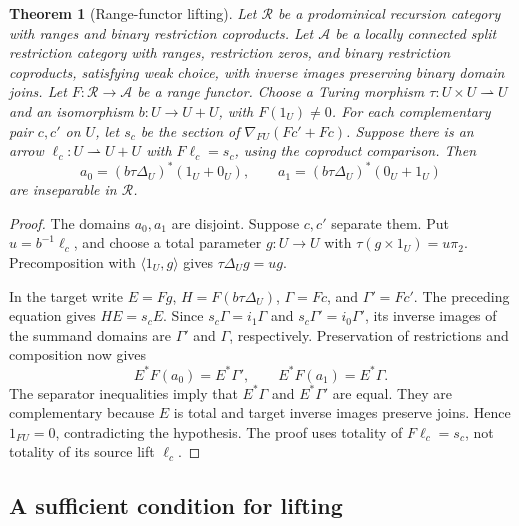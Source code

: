\documentclass[11pt]{article}
\newtheorem{theorem}{Theorem}[section]
\begin{document}
\begin{theorem}[Range-functor lifting]\label{thm:local-lifting}
Let $\mathscr R$ be a prodominical recursion category with ranges and
binary restriction coproducts. Let $\mathcal A$ be a locally connected
split restriction category with ranges, restriction zeros, and binary
restriction coproducts, satisfying weak choice, with inverse images
preserving binary domain joins. Let
$F:\mathscr R\to\mathcal A$ be a range functor.
Choose a Turing morphism $\tau:U\times U\rightharpoonup U$ and
an isomorphism $b:U\to U+U$, with $F(1_U)\ne0$.
For each complementary pair $c,c'$ on $U$, let $s_c$ be the section
of $\nabla_{FU}(Fc'+Fc)$. Suppose there is an arrow
$\ell_c:U\rightharpoonup U+U$ with $F\ell_c=s_c$, using the coproduct
comparison. Then
\[
 a_0=(b\tau\Delta_U)^*(1_U+0_U),\qquad
 a_1=(b\tau\Delta_U)^*(0_U+1_U)
\]
are inseparable in $\mathscr R$.
\end{theorem}
\begin{proof}
The domains $a_0,a_1$ are disjoint. Suppose $c,c'$ separate them.
Put $u=b^{-1}\ell_c$, and choose a total parameter $g:U\to U$ with
$\tau(g\times1_U)=u\pi_2$. Precomposition with $\langle1_U,g\rangle$
gives $\tau\Delta_Ug=ug$.

In the target write $E=Fg$, $H=F(b\tau\Delta_U)$, $\Gamma=Fc$,
and $\Gamma'=Fc'$. The preceding equation gives $HE=s_cE$.
Since $s_c\Gamma=i_1\Gamma$ and $s_c\Gamma'=i_0\Gamma'$,
its inverse images of the summand domains are $\Gamma'$ and $\Gamma$,
respectively. Preservation of restrictions and composition now gives
\[
 E^*F(a_0)=E^*\Gamma',\qquad E^*F(a_1)=E^*\Gamma.
\]
The separator inequalities imply that $E^*\Gamma$ and $E^*\Gamma'$
are equal. They are complementary because $E$ is total and target
inverse images preserve joins. Hence $1_{FU}=0$, contradicting the
hypothesis. The proof uses totality of $F\ell_c=s_c$, not totality of
its source lift $\ell_c$.
\end{proof}

\subsection{A sufficient condition for lifting}
\end{document}
